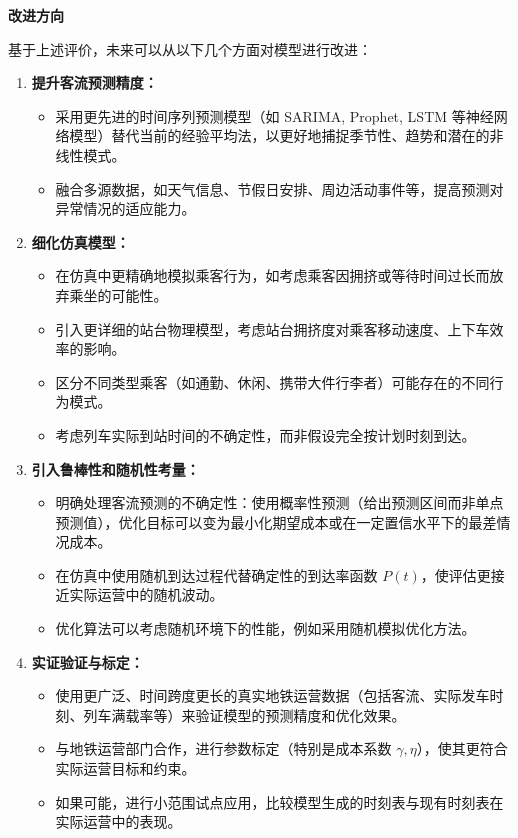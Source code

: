 \textbf{改进方向}

基于上述评价，未来可以从以下几个方面对模型进行改进：
\begin{enumerate}
    \item \textbf{提升客流预测精度：}
        \begin{itemize}
            \item 采用更先进的时间序列预测模型（如 SARIMA, Prophet, LSTM 等神经网络模型）替代当前的经验平均法，以更好地捕捉季节性、趋势和潜在的非线性模式。
            \item 融合多源数据，如天气信息、节假日安排、周边活动事件等，提高预测对异常情况的适应能力。
        \end{itemize}
    \item \textbf{细化仿真模型：}
        \begin{itemize}
            \item 在仿真中更精确地模拟乘客行为，如考虑乘客因拥挤或等待时间过长而放弃乘坐的可能性。
            \item 引入更详细的站台物理模型，考虑站台拥挤度对乘客移动速度、上下车效率的影响。
            \item 区分不同类型乘客（如通勤、休闲、携带大件行李者）可能存在的不同行为模式。
            \item 考虑列车实际到站时间的不确定性，而非假设完全按计划时刻到达。
        \end{itemize}
    \item \textbf{引入鲁棒性和随机性考量：}
        \begin{itemize}
            \item 明确处理客流预测的不确定性：使用概率性预测（给出预测区间而非单点预测值），优化目标可以变为最小化期望成本或在一定置信水平下的最差情况成本。
            \item 在仿真中使用随机到达过程代替确定性的到达率函数 $P(t)$，使评估更接近实际运营中的随机波动。
            \item 优化算法可以考虑随机环境下的性能，例如采用随机模拟优化方法。
        \end{itemize}
    \item \textbf{实证验证与标定：}
        \begin{itemize}
            \item 使用更广泛、时间跨度更长的真实地铁运营数据（包括客流、实际发车时刻、列车满载率等）来验证模型的预测精度和优化效果。
            \item 与地铁运营部门合作，进行参数标定（特别是成本系数 $\gamma, \eta$），使其更符合实际运营目标和约束。
            \item 如果可能，进行小范围试点应用，比较模型生成的时刻表与现有时刻表在实际运营中的表现。
        \end{itemize}
\end{enumerate}

